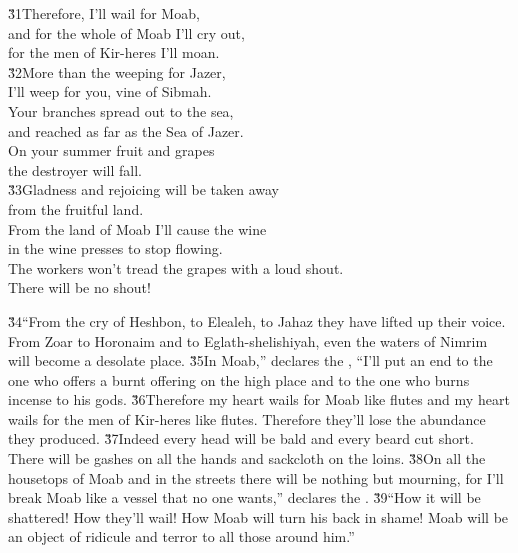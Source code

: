 \begin{poetry}
\poeml \v{31}Therefore, I'll wail for Moab, \\
\poemll    and for the whole of Moab I'll cry out, \\
\poemll    for the men of Kir-heres I'll moan. \\
\poeml \v{32}More than the weeping for Jazer, \\
\poemll    I'll weep for you, vine of Sibmah. \\
\poeml Your branches spread out to the sea, \\
\poemll    and reached as far as the Sea of Jazer. \\
\poeml On your summer fruit and grapes \\
\poemll    the destroyer will fall. \\
\poeml \v{33}Gladness and rejoicing will be taken away \\
\poemll    from the fruitful land. \\
\poeml From the land of Moab I'll cause the wine \\
\poemll    in the wine presses to stop flowing. \\
\poeml The workers won't tread the grapes with a loud shout. \\
\poemll    There will be no shout!
\end{poetry}

\v{34}``From the cry of Heshbon, to Elealeh, to Jahaz they have lifted up their voice. From Zoar to Horonaim and to Eglath-shelishiyah, even the waters of Nimrim will become a desolate place. \v{35}In Moab,'' declares the , ``I'll put an end to the one who offers a burnt offering on the high place and to the one who burns incense to his gods. \v{36}Therefore my heart wails for Moab like flutes and my heart wails for the men of Kir-heres like flutes. Therefore they'll lose the abundance they produced. \v{37}Indeed every head will be bald and every beard cut short. There will be gashes on all the hands and sackcloth on the loins. \v{38}On all the housetops of Moab and in the streets there will be nothing but mourning, for I'll break Moab like a vessel that no one wants,'' declares the . \v{39}``How it will be shattered! How they'll wail! How Moab will turn his back in shame! Moab will be an object of ridicule and terror to all those around him.''

